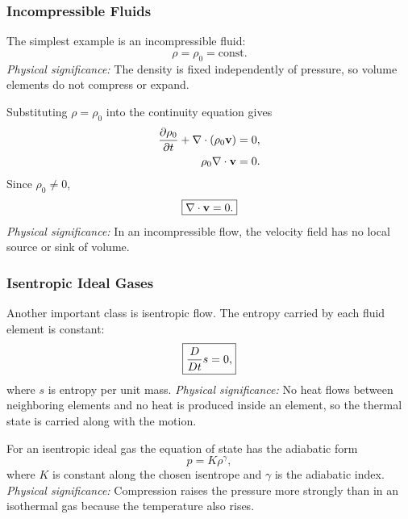 \documentclass[../main.tex]{subfiles}
\begin{document}
\subsubsection{Incompressible Fluids}\label{subsec:lec12:incompressible-closure}
The simplest example is an incompressible fluid:
\begin{equation}
  \boxed{\rho=\rho_0=\mathrm{const}.}
  \label{eq:lec12_incompressible_density}
\end{equation}
\textit{Physical significance:} The density is fixed independently of pressure, so volume elements do not compress or expand.

Substituting $\rho=\rho_0$ into the continuity equation gives
\begin{align}
  \pdv{\rho_0}{t}+\nabla \cdot(\rho_0\mathbf{v})
  &=
  0,
  \label{eq:lec12_incompressible_continuity_1}\\
  \rho_0\nabla \cdot\mathbf{v}
  &=
  0.
  \label{eq:lec12_incompressible_continuity_2}
\end{align}
Since $\rho_0\ne0$,
\begin{equation}
  \boxed{\nabla \cdot\mathbf{v}=0.}
  \label{eq:lec12_incompressible_divergence_free}
\end{equation}
\textit{Physical significance:} In an incompressible flow, the velocity field has no local source or sink of volume.

\subsubsection{Isentropic Ideal Gases}\label{subsec:lec12:isentropic-gas}
Another important class is isentropic flow. The entropy carried by each fluid element is constant:
\begin{equation}
  \boxed{\frac{D}{Dt} s=0,}
  \label{eq:lec12_isentropic_condition}
\end{equation}
where $s$ is entropy per unit mass.
\textit{Physical significance:} No heat flows between neighboring elements and no heat is produced inside an element, so the thermal state is carried along with the motion.

For an isentropic ideal gas the equation of state has the adiabatic form
\begin{equation}
  \boxed{p=K\rho^\gamma,}
  \label{eq:lec12_adiabatic_ideal_gas}
\end{equation}
where $K$ is constant along the chosen isentrope and $\gamma$ is the adiabatic index.
\textit{Physical significance:} Compression raises the pressure more strongly than in an isothermal gas because the temperature also rises.
\end{document}
